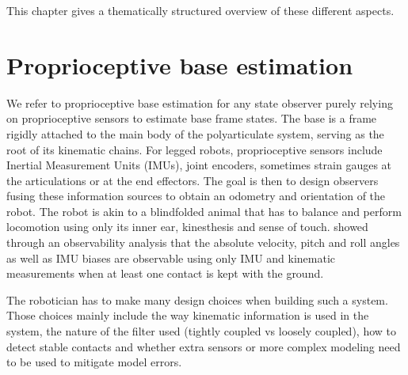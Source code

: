 This chapter gives a thematically structured overview of these different aspects. 





\section{Proprioceptive base estimation}
We refer to proprioceptive base estimation for any state observer purely relying on proprioceptive sensors to estimate base frame states. 
The base is a frame rigidly attached to the main body of the polyarticulate system, serving
as the root of its kinematic chains. For legged robots, proprioceptive sensors include Inertial Measurement Units (IMUs), joint encoders, sometimes strain gauges at the 
articulations or at the end effectors. The goal is then to design observers fusing these information sources to obtain an odometry and orientation of the robot. 
The robot is akin to a blindfolded animal that has to balance and perform locomotion using 
only its inner ear, kinesthesis and sense of touch. \cite{bloesch2013state,rotella2014state} showed through an observability analysis that the absolute velocity, pitch and roll angles 
as well as IMU biases are observable using only IMU and kinematic measurements when at least one contact is kept with the ground.

The robotician has to make many design choices when building such a system. Those choices mainly include the way kinematic information is used in the system, 
the nature of the filter used (tightly coupled vs loosely coupled), how to detect stable contacts and whether extra sensors or more complex modeling need 
to be used to mitigate model errors.
 

